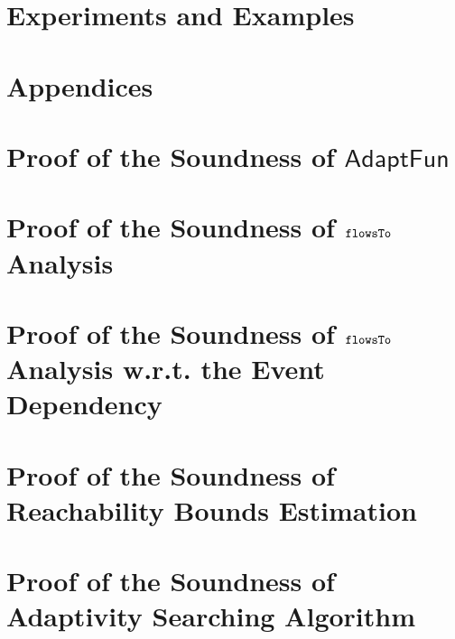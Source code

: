 \documentclass[a4paper,11pt]{article}
\newcommand{\THESYSTEM}{\textsf{AdaptFun}}
\begin{document}
\section{Experiments and Examples}

%
\clearpage
\appendix
{}
\section*{Appendices}
\section{Proof of the Soundness of $\THESYSTEM$}
\label{apdx:adapt_soundness}

\clearpage
\section{Proof of the Soundness of $\mathtt{flowsTo}$ Analysis}
\label{apdx:flowsto_soundness}

\clearpage
\section{Proof of the Soundness of $\mathtt{flowsTo}$ Analysis w.r.t. the Event Dependency}
\label{apdx:flowsto_event_soundness}

\clearpage
% 
% 
\clearpage
\section{Proof of the Soundness of Reachability Bounds Estimation}
\label{apdx:reachability_soundness}

\clearpage
\section{Proof of the Soundness of Adaptivity Searching Algorithm}
\label{apdx:adaptalg_soundness}



\end{document}
